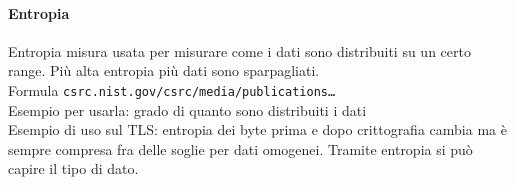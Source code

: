 \documentclass[10pt]{book}
\begin{document}
\paragraph{Entropia} Entropia misura usata per misurare come i dati sono distribuiti su un certo range. Più alta entropia più dati sono sparpagliati.\\
Formula \texttt{csrc.nist.gov/csrc/media/publications\ldots}\\
Esempio per usarla: grado di quanto sono distribuiti i dati\\
Esempio di uso sul TLS: entropia dei byte prima e dopo crittografia cambia ma è sempre compresa fra delle soglie per dati omogenei. Tramite entropia si può capire il tipo di dato.
\end{document}
